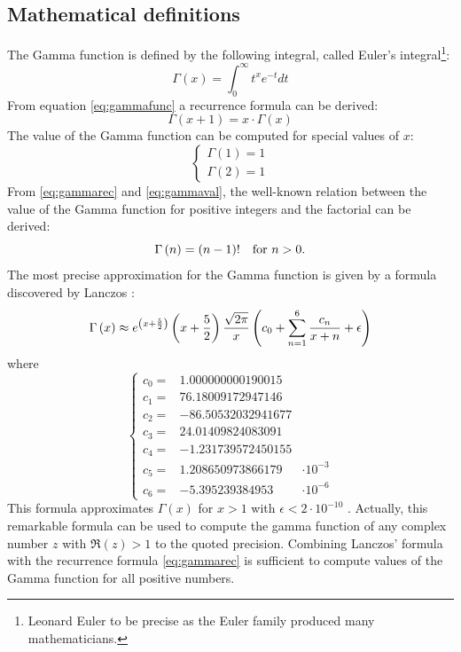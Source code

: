 \subsection{Mathematical definitions}
\label{sec:gammafunc} The Gamma function is defined by the
following integral, called Euler's integral\footnote{Leonard Euler
to be precise as the Euler family produced many mathematicians.}:
\begin{equation}
\label{eq:gammafunc} \Gamma\left(x\right)=\int_0^\infty t^x
e^{-t}dt
\end{equation}
From equation \ref{eq:gammafunc} a recurrence formula can be
derived:
\begin{equation}
\label{eq:gammarec} \Gamma\left(x+1\right)=x \cdot
\Gamma\left(x\right)
\end{equation}
The value of the Gamma function can be computed for special values
of $x$:
\begin{equation}
\label{eq:gammaval}\left\{
\begin{array}{lr}\Gamma\left(1\right)=1\\\Gamma\left(2\right)=1
\end{array}\right.
\end{equation}
From \ref{eq:gammarec} and \ref{eq:gammaval}, the well-known
relation between the value of the Gamma function for positive
integers and the factorial can be derived:
\begin{equation}
\label{eq:gammafact} \Gamma\left(n\right)=\left(n-1\right)!
\mbox{\quad for $n>0$}.
\end{equation}
The most precise approximation for the Gamma function is given by
a formula discovered by Lanczos \cite{Press}:
\begin{equation}
\label{eq:lanczos} \Gamma\left(x\right)\approx e^{\left(x+{5\over
2}\right)}\left(x+{5\over 2}\right){\sqrt{2\pi}\over x
}\left(c_0+\sum_{n=1}^6{c_n \over x + n}+\epsilon\right)
\end{equation}
where
\begin{equation}
\label{eq:lanczosconst}\left\{ \begin{array}{lrl}c_0
=&1.000000000190015
\\c_1 =&76.18009172947146 \\ c_2 =&-86.50532032941677
\\c_3 =&24.01409824083091 \\ c_4 =&-1.231739572450155
\\ c_5 =&1.208650973866179&\cdot 10^{-3} \\ c_6 =&-5.395239384953&\cdot 10^{-6}
\end{array}\right.
\end{equation}
This formula approximates $\Gamma\left(x\right)$ for $x>1$ with
$\epsilon<2\cdot 10^{-10}$ . Actually, this remarkable formula can
be used to compute the gamma function of any complex number $z$
with $\Re\left(z\right)>1$ to the quoted precision. Combining
Lanczos' formula with the recurrence formula \ref{eq:gammarec} is
sufficient to compute values of the Gamma function for all
positive numbers.

